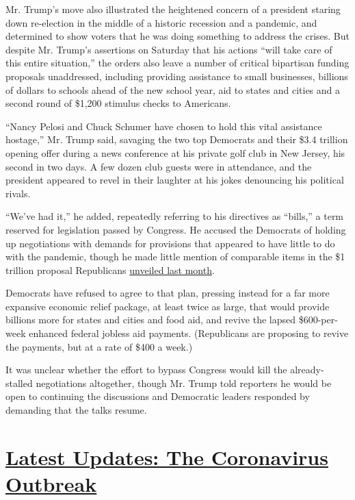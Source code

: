 Mr. Trump's move also illustrated the heightened concern of a president
staring down re-election in the middle of a historic recession and a
pandemic, and determined to show voters that he was doing something to
address the crises. But despite Mr. Trump's assertions on Saturday that
his actions ``will take care of this entire situation,'' the orders also
leave a number of critical bipartisan funding proposals unaddressed,
including providing assistance to small businesses, billions of dollars
to schools ahead of the new school year, aid to states and cities and a
second round of \$1,200 stimulus checks to Americans.

``Nancy Pelosi and Chuck Schumer have chosen to hold this vital
assistance hostage,'' Mr. Trump said, savaging the two top Democrats and
their \$3.4 trillion opening offer during a news conference at his
private golf club in New Jersey, his second in two days. A few dozen
club guests were in attendance, and the president appeared to revel in
their laughter at his jokes denouncing his political rivals.

``We've had it,'' he added, repeatedly referring to his directives as
``bills,'' a term reserved for legislation passed by Congress. He
accused the Democrats of holding up negotiations with demands for
provisions that appeared to have little to do with the pandemic, though
he made little mention of comparable items in the \$1 trillion proposal
Republicans
\href{https://www.nytimes3xbfgragh.onion/2020/07/27/us/politics/republicans-jobless-aid.html}{unveiled
last month}.

Democrats have refused to agree to that plan, pressing instead for a far
more expansive economic relief package, at least twice as large, that
would provide billions more for states and cities and food aid, and
revive the lapsed \$600-per-week enhanced federal jobless aid payments.
(Republicans are proposing to revive the payments, but at a rate of
\$400 a week.)

It was unclear whether the effort to bypass Congress would kill the
already-stalled negotiations altogether, though Mr. Trump told reporters
he would be open to continuing the discussions and Democratic leaders
responded by demanding that the talks resume.

\hypertarget{latest-updates-the-coronavirus-outbreak}{%
\section{\texorpdfstring{\href{https://www.nytimes3xbfgragh.onion/2020/09/11/world/covid-19-coronavirus.html?action=click\&pgtype=Article\&state=default\&region=MAIN_CONTENT_1\&context=storylines_live_updates}{Latest
Updates: The Coronavirus
Outbreak}}{Latest Updates: The Coronavirus Outbreak}}\label{latest-updates-the-coronavirus-outbreak}}


